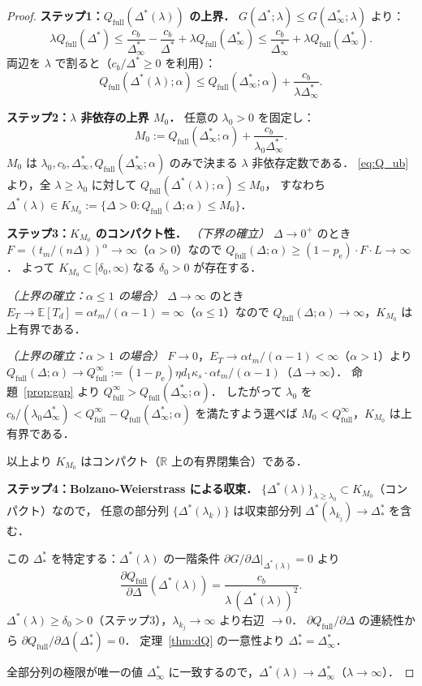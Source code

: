 \documentclass[12pt,a4paper]{article}
\theoremstyle{plain}
\theoremstyle{definition}
\theoremstyle{remark}
\newcommand{\E}{\mathbb{E}}
\newcommand{\pe}{p_{\mathrm{e}}}
\newcommand{\Qf}{Q_{\mathrm{full}}}
\newcommand{\Dopt}{\Delta^{*}}
\newcommand{\Dinf}{\Delta^{*}_{\infty}}
\begin{document}
\begin{proof}
\textbf{ステップ1：$\Qf(\Dopt(\lambda))$ の上界．}
$G(\Dopt;\lambda)\le G(\Dinf;\lambda)$ より：
\[
\lambda\Qf(\Dopt)\le\frac{c_b}{\Dinf}-\frac{c_b}{\Dopt}+\lambda\Qf(\Dinf)
\le\frac{c_b}{\Dinf}+\lambda\Qf(\Dinf).
\]
両辺を $\lambda$ で割ると（$c_b/\Dopt\ge0$ を利用）：
\begin{equation}\label{eq:Q_ub}
\Qf(\Dopt(\lambda);\alpha)\le\Qf(\Dinf;\alpha)+\frac{c_b}{\lambda\Dinf}.
\end{equation}

\textbf{ステップ2：$\lambda$ 非依存の上界 $M_0$．}
任意の $\lambda_0>0$ を固定し：
\begin{equation}\label{eq:M0}
M_0:=\Qf(\Dinf;\alpha)+\frac{c_b}{\lambda_0\Dinf}.
\end{equation}
$M_0$ は $\lambda_0,c_b,\Dinf,\Qf(\Dinf;\alpha)$ のみで決まる $\lambda$ 非依存定数である．
\eqref{eq:Q_ub} より，全 $\lambda\ge\lambda_0$ に対して
$\Qf(\Dopt(\lambda);\alpha)\le M_0$，
すなわち $\Dopt(\lambda)\in K_{M_0}:=\{\Delta>0:\Qf(\Delta;\alpha)\le M_0\}$．

\textbf{ステップ3：$K_{M_0}$ のコンパクト性．}
\emph{（下界の確立）}
$\Delta\to0^+$ のとき $F=(t_m/(n\Delta))^\alpha\to\infty$（$\alpha>0$）なので
$\Qf(\Delta;\alpha)\ge(1-\pe)\cdot F\cdot L\to\infty$．
よって $K_{M_0}\subset[\delta_0,\infty)$ なる $\delta_0>0$ が存在する．

\emph{（上界の確立：$\alpha\le1$ の場合）}
$\Delta\to\infty$ のとき $E_T\to\E[T_d]=\alpha t_m/(\alpha-1)=\infty$（$\alpha\le1$）なので
$\Qf(\Delta;\alpha)\to\infty$，$K_{M_0}$ は上有界である．

\emph{（上界の確立：$\alpha>1$ の場合）}
$F\to0$，$E_T\to\alpha t_m/(\alpha-1)<\infty$（$\alpha>1$）より
$\Qf(\Delta;\alpha)\to\Qf^\infty:=(1-\pe)\eta d_1\kappa_s\cdot\alpha t_m/(\alpha-1)$（$\Delta\to\infty$）．
命題~\ref{prop:gap} より $\Qf^\infty>\Qf(\Dinf;\alpha)$．
したがって $\lambda_0$ を $c_b/(\lambda_0\Dinf)<\Qf^\infty-\Qf(\Dinf;\alpha)$
を満たすよう選べば $M_0<\Qf^\infty$，$K_{M_0}$ は上有界である．

以上より $K_{M_0}$ はコンパクト（$\mathbb{R}$ 上の有界閉集合）である．

\textbf{ステップ4：Bolzano-Weierstrass による収束．}
$\{\Dopt(\lambda)\}_{\lambda\ge\lambda_0}\subset K_{M_0}$（コンパクト）なので，
任意の部分列 $\{\Dopt(\lambda_k)\}$ は収束部分列 $\Dopt(\lambda_{k_j})\to\Dopt_*$ を含む．

この $\Dopt_*$ を特定する：$\Dopt(\lambda)$ の一階条件
$\partial G/\partial\Delta|_{\Dopt(\lambda)}=0$ より
\[
\frac{\partial\Qf}{\partial\Delta}(\Dopt(\lambda))=\frac{c_b}{\lambda\,(\Dopt(\lambda))^2}.
\]
$\Dopt(\lambda)\ge\delta_0>0$（ステップ3），$\lambda_{k_j}\to\infty$ より右辺 $\to0$．
$\partial\Qf/\partial\Delta$ の連続性から $\partial\Qf/\partial\Delta(\Dopt_*)=0$．
定理~\ref{thm:dQ} の一意性より $\Dopt_*=\Dinf$．

全部分列の極限が唯一の値 $\Dinf$ に一致するので，$\Dopt(\lambda)\to\Dinf$（$\lambda\to\infty$）．
\end{proof}
\end{document}
